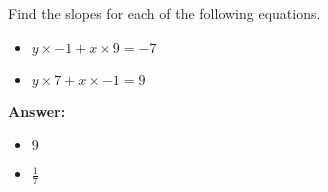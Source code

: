  Find the slopes for each of the following equations. \begin{itemize}\item \( y \times -1 + x \times 9 = -7 \)\item \( y \times 7 + x \times -1 = 9 \)\end{itemize}

        \textbf{Answer:} \begin{itemize}\item \( 9 \)\item \( \frac{1}{7} \)\end{itemize}
